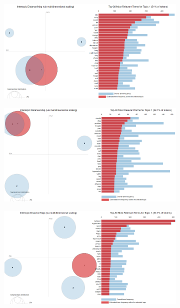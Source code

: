 \documentclass[sn-mathphys,Numbered]{sn-jnl}%
\theoremstyle{thmstyleone}%
\theoremstyle{thmstyletwo}%
\theoremstyle{thmstylethree}%
\begin{document}
\begin{figure}[h!]
\centering
\begin{subfigure}{0.45\textwidth}
    \includegraphics[width=\textwidth]{indicator_pyldvis.png}
    \label{redditdist}
\end{subfigure}
\hfill
\begin{subfigure}{0.45\textwidth}
    \includegraphics[width=\textwidth]{Behavior_pyldvis.png}
    \label{twitterdist}
\end{subfigure}      
\centering
\begin{subfigure}{0.45\textwidth}
    \includegraphics[width=\textwidth]{Ideation_pyldvis.png}

\end{subfigure}
\end{figure}
\end{document}
